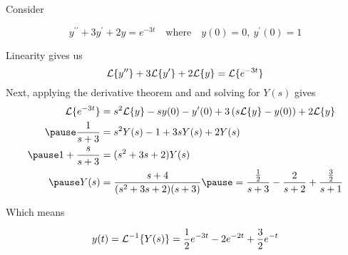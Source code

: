 \documentclass{beamer}
\begin{document}
\begin{frame}
\begin{example}
Consider

\vspace{-5mm}
\begin{equation*}
y^{\prime\prime}+3y^\prime+2y=e^{-3t}
\quad\text{where}\quad
y(0)=0,~y^\prime(0)=1
\end{equation*}\pause

\vspace{-5mm}
Linearity gives us
\begin{equation*}
\mathcal{L}\{y^{\prime\prime}\}+3\mathcal{L}\{y^\prime\}+2\mathcal{L}\{y\}=\mathcal{L}\{e^{-3t}\}
\end{equation*}\pause
Next, applying the derivative theorem and and solving for $Y(s)$ gives
\begin{equation*}
\begin{aligned}
\laplace\{e^{-3t}\} &= s^2\laplace\{y\}-sy(0)-y^\prime(0)+3\left(s\laplace\{y\}-y(0)\right) + 2\laplace\{y\}\\\pause
\dfrac{1}{s+3}&=s^2 Y(s)-1+3s Y(s) +2Y(s)\\\pause
 1 + \dfrac{s}{s+3} &= (s^2+3s+2) Y(s)\\\pause
Y(s)&=\dfrac{s+4}{(s^2+3s+2)(s+3)}\pause
=\dfrac{\tfrac{1}{2}}{s+3} - \dfrac{2}{s+2} +\dfrac{\tfrac{3}{2}}{s+1}
\end{aligned}
\end{equation*}\pause

\vspace{-5.5mm}
Which means

\vspace{-5mm}
\begin{equation*}
y(t)=\mathcal{L}^{-1}\{Y(s)\}=\dfrac{1}{2}e^{-3t}-2e^{-2t}+\dfrac{3}{2}e^{-t}
\end{equation*}
\end{example}
\end{frame}
\end{document}
